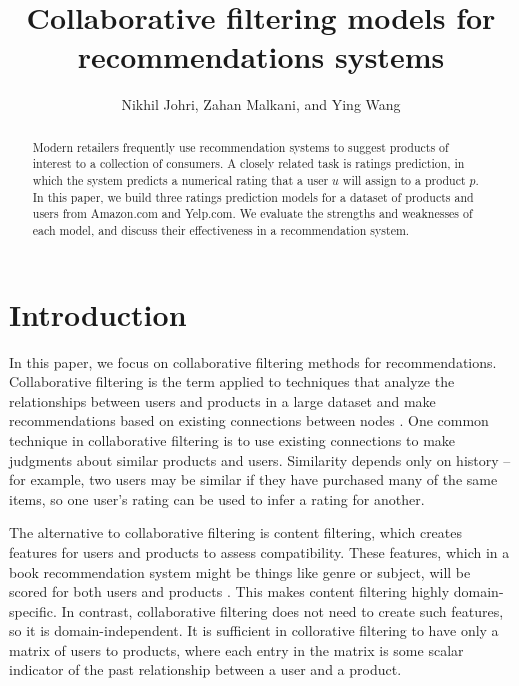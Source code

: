 \documentclass[letterpaper, 11 pt, conference]{ieeeconf}
\title{\LARGE \bf
Collaborative filtering models for recommendations systems
}
\author{Nikhil Johri, Zahan Malkani, and Ying Wang
}
\begin{document}
\maketitle
\thispagestyle{empty}
\pagestyle{empty}


\begin{abstract}
Modern retailers frequently use recommendation systems to suggest products of 
interest to a collection of consumers. A closely related task is ratings 
prediction, in which the system predicts a numerical rating that a 
user $u$ will assign to a product $p$. In this paper, we build three ratings 
prediction models for a dataset of products and users from Amazon.com and 
Yelp.com. 
We evaluate the strengths and weaknesses of each model, and discuss their 
effectiveness in a recommendation system.

\end{abstract}

\section{Introduction}
In this paper, we focus on collaborative filtering methods for recommendations. 
Collaborative filtering is the term applied to techniques that analyze the 
relationships between users and products in a large dataset and make 
recommendations based on existing connections between nodes \cite{bib:recsys}.
One common technique in collaborative filtering is to use existing connections 
to make judgments about similar products and users. Similarity depends only on 
history -- for example, two users may be similar if they have purchased many 
of the same items, so one user's rating can be used to infer a rating for 
another. 

The alternative to collaborative filtering is content filtering, which 
creates features for users and products to assess compatibility. These 
features, which in a book recommendation system might be things like genre or 
subject, will be scored for both users and products \cite{bib:recsys}. This 
makes content filtering highly domain-specific. 
In contrast, collaborative filtering does not need to create such features, 
so it is domain-independent. It is sufficient in collorative filtering to have 
only a matrix of users to products, where each entry in the matrix is some 
scalar indicator of the past relationship between a user and a product.
\end{document}
